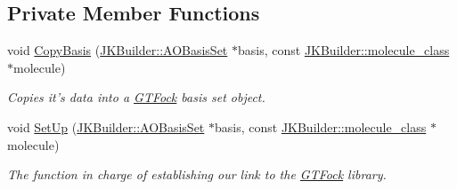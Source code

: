 \subsection*{Private Member Functions}
\begin{DoxyCompactItemize}
\item 
void \hyperlink{classGTFock_1_1DistGTFock_af1268d1c5fac4a061b995c267bf9f219}{CopyBasis} (\hyperlink{classJKBuilder_1_1AOBasisSet}{JKBuilder::AOBasisSet} $\ast$basis, const \hyperlink{classJKBuilder_1_1molecule__class}{JKBuilder::molecule\_\-class} $\ast$molecule)
\begin{DoxyCompactList}\small\item\em Copies it's data into a \hyperlink{namespaceGTFock}{GTFock} basis set object. \item\end{DoxyCompactList}\item 
void \hyperlink{classGTFock_1_1DistGTFock_a0da100e6aeb49168e1c88c7cfae6e976}{SetUp} (\hyperlink{classJKBuilder_1_1AOBasisSet}{JKBuilder::AOBasisSet} $\ast$basis, const \hyperlink{classJKBuilder_1_1molecule__class}{JKBuilder::molecule\_\-class} $\ast$molecule)
\begin{DoxyCompactList}\small\item\em The function in charge of establishing our link to the \hyperlink{namespaceGTFock}{GTFock} library. \item\end{DoxyCompactList}\end{DoxyCompactItemize}
